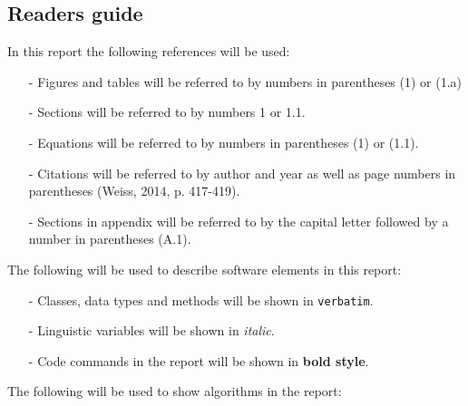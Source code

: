 \documentclass[../Head/Main.tex]{subfiles}
\begin{document}


\subsection{Readers guide}

In this report the following references will be used:

\begin{itemize}

\item[-] Figures and tables will be referred to by numbers in parentheses (1) or (1.a)
\item[-] Sections will be referred to by numbers 1 or 1.1.
\item[-] Equations will be referred to by numbers in parentheses (1) or (1.1).
\item[-] Citations will be referred to by author and year as well as page numbers in parentheses (Weiss, 2014, p. 417-419). 
\item[-] Sections in appendix will be referred to by the capital letter followed by a number in parentheses (A.1).   
\end{itemize}

The following will be used to describe software elements in this report:

\begin{itemize}

\item[-] Classes, data types and methods will be shown in \texttt{verbatim}. 
\item[-] Linguistic variables will be shown in \textit{italic}.
\item[-] Code commands in the report will be shown in \textbf{bold style}.
 
\end{itemize}

The following will be used to show algorithms in the report: 


\end{document}
